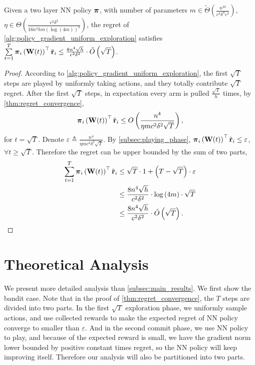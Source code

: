 \begin{thm}
\label{thm:main_result}
    Given a two layer NN policy ${\boldsymbol{\pi}}$, with number of parameters $m \in \tilde{\Theta}\left( \frac{n^{10}}{c^4 \delta^4 \varepsilon^2} \right)$, $\eta \in \Theta\left( \frac{c^2 \delta^2}{16 n^4 h m \left( \log{\left(4m\right)} \right)^2} \right)$, the regret of \cref{alg:policy_gradient_uniform_exploration} satisfies $\sum\limits_{t=1}^{T}{ {\boldsymbol{\pi}}_i\left( {\mathbf{W}}(t) \right)^\top {\tilde{\mathbf{r}}}_i } \le  \frac{8 n^4 \sqrt{h}}{c^2 \delta^2} \cdot \tilde{O}\left( \sqrt{T} \right)$.
\end{thm}
\begin{proof}
According to \cref{alg:policy_gradient_uniform_exploration}, the first $\sqrt{T}$ steps are played by uniformly taking actions, and they totally contribute $\sqrt{T}$ regret. After the first $\sqrt{T}$ steps, in expectation every arm is pulled $\frac{\sqrt{T}}{h}$ times, by \cref{thm:regret_convergence}, 
\begin{equation*}
\begin{split}
    {\boldsymbol{\pi}}_i\left( {\mathbf{W}}(t) \right)^\top {\tilde{\mathbf{r}}}_i \le O\left( \frac{n^4}{\eta m c^2 \delta^2 \sqrt{T}} \right),
\end{split}
\end{equation*}
for $t = \sqrt{T}$. Denote $\varepsilon \triangleq \frac{n^4}{\eta m c^2 \delta^2 \sqrt{T}}$. By \cref{subsec:playing_phase}, ${\boldsymbol{\pi}}_i\left( {\mathbf{W}}(t) \right)^\top {\tilde{\mathbf{r}}}_i \le \varepsilon$, $\forall t \ge \sqrt{T}$. Therefore the regret can be upper bounded by the sum of two parts,
\begin{equation*}
\begin{split}
    \sum\limits_{t=1}^{T}{ {\boldsymbol{\pi}}_i\left( {\mathbf{W}}(t) \right)^\top {\tilde{\mathbf{r}}}_i } &\le \sqrt{T} \cdot 1 + \left(T - \sqrt{T} \right) \cdot \varepsilon \\
    &\le \frac{8 n^4 \sqrt{h}}{c^2 \delta^2} \cdot \log{\left(4m\right)} \cdot \sqrt{T} \\
    &\le \frac{8 n^4 \sqrt{h}}{c^2 \delta^2} \cdot \tilde{O}\left(\sqrt{T}\right). \qedhere
\end{split}
\end{equation*}
\end{proof}

\section{Theoretical Analysis}

We present more detailed analysis than \cref{subsec:main_results}. We first show the bandit case. Note that in the proof of \cref{thm:regret_convergence}, the $T$ steps are divided into two parts. In the first $\sqrt{T}$ exploration phase, we uniformly sample actions, and use collected rewards to make the expected regret of NN policy converge to smaller than $\varepsilon$. And in the second commit phase, we use NN policy to play, and because of the expected reward is small, we have the gradient norm lower bounded by positive constant times regret, so the NN policy will keep improving itself. Therefore our analysis will also be partitioned into two parts.

